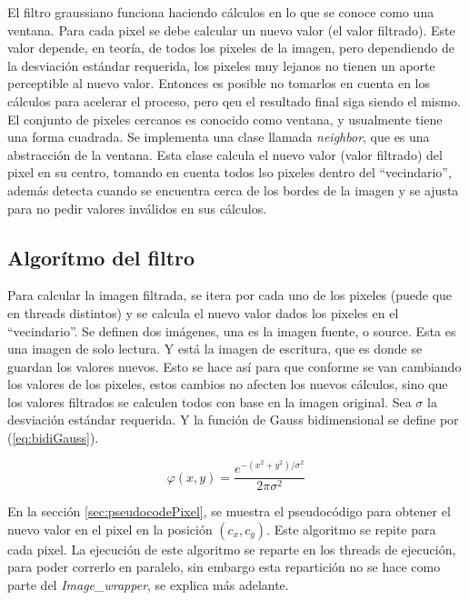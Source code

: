 \documentclass {article}
\begin{document}
El filtro graussiano funciona haciendo cálculos en lo que se conoce como una ventana. Para cada
pixel se debe calcular un nuevo valor (el valor filtrado). Este valor depende, en teoría, de todos
los pixeles de la imagen, pero dependiendo de la desviación estándar requerida, los pixeles muy
lejanos no tienen un aporte perceptible al nuevo valor. Entonces es posible no tomarlos en cuenta en
los cálculos para acelerar el proceso, pero qeu el resultado final siga siendo el mismo. El conjunto
de pixeles cercanos es conocido como ventana, y usualmente tiene una forma cuadrada. Se implementa
una clase llamada \textit{neighbor}, que es una abstracción de la ventana. Esta clase calcula el
nuevo valor (valor filtrado) del pixel en su centro, tomando en cuenta todos lso pixeles dentro del
``vecindario'', además detecta cuando
se encuentra cerca de los bordes de la imagen y se ajusta para no pedir valores inválidos en sus
cálculos.

\subsection{Algorítmo del filtro}

Para calcular la imagen filtrada, se itera por cada uno de los pixeles (puede que en threads
distintos) y se calcula el nuevo valor dados los pixeles en el ``vecindario''. Se definen dos
imágenes, una es la imagen fuente, o source. Esta es una imagen de solo lectura. Y está la imagen de
escritura, que es donde se guardan los valores nuevos. Esto se hace así para que conforme se van
cambiando los valores de los pixeles, estos cambios no afecten los nuevos cálculos, sino que los
valores filtrados se calculen todos con base en la imagen original. Sea $\sigma$ la desviación
estándar requerida. Y la función de Gauss bidimensional se define por (\ref{eq:bidiGauss}).

\begin{equation}
  \varphi (x, y)= \frac{e^{-(x^2+y^2)/\sigma^2}}{2\pi \sigma^2} 
  \label{eq:bidiGauss}
\end{equation}

En la sección \ref{sec:pseudocodePixel}, se muestra el pseudocódigo para obtener el nuevo valor en
el pixel en la posición $(c_x, c_y)$. Este algoritmo se repite para cada pixel. La ejecución de este
algoritmo se reparte en los threads de ejecución, para poder correrlo en paralelo, sin embargo esta
repartición no se hace como parte del \textit{Image\_wrapper}, se explica más adelante.
\end{document}
